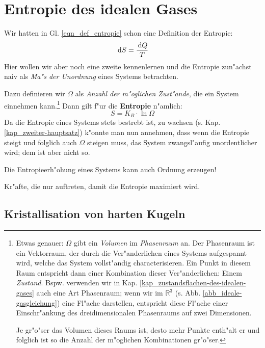 \section{Entropie des idealen Gases}
\label{kap_entropie-des-idealen-gases}


Wir hatten in Gl. \eqref{eqn_def_entropie} schon eine Definition der
Entropie:
$$
\, \mathrm{d} S = \frac{\, \mathrm{d} Q}{T}
$$
Hier wollen wir aber noch eine zweite kennenlernen und die Entropie
zun"achst naiv als \emph{Ma"s der Unordnung} eines Systems betrachten.

Dazu definieren wir $\Omega$ als \emph{Anzahl der m"oglichen
  Zust"ande}, die ein System einnehmen kann.\footnote{Etwas genauer:
  $\Omega$ gibt ein \emph{Volumen} im
  \emph{Phasenraum} an. Der Phasenraum ist ein
  Vektorraum, der durch die Ver"anderlichen eines Systems aufgespannt
  wird, welche das System vollst"andig characterisieren. Ein Punkt in
  diesem Raum entspricht dann einer Kombination dieser
  Ver"anderlichen: Einem \emph{Zustand}. Bspw. verwenden wir in
  Kap. \ref{kap_zustandsflachen-des-idealen-gases} auch eine Art
  Phasenraum; wenn wir im $\mathbb R^3$
  (s. Abb. \ref{abb_ideale-gasgleichung}) eine Fl"ache darstellen,
  entspricht diese Fl"ache einer Einschr"ankung des dreidimensionalen
  Phasenraums auf zwei Dimensionen.

  Je gr"o"ser das Volumen dieses Raums ist, desto mehr Punkte enth"alt er
  und folglich ist so die Anzahl der m"oglichen Kombinationen gr"o"ser.}
Dann gilt f"ur die \textbf{Entropie} n"amlich:
\begin{equation}
   \label{eqn_def_entropie_zustaende}
   S = K_B \cdot \ln \Omega
\end{equation}
Da die Entropie eines Systems stets bestrebt ist, zu wachsen
(s. Kap. \ref{kap_zweiter-hauptsatz}) k"onnte man nun annehmen, dass
wenn die Entropie steigt und folglich auch $\Omega$ steigen muss, das
System zwangsl"aufig unordentlicher wird; dem ist aber nicht so.

\begin{Wichtig}
   Die Entropieerh"ohung eines Systems kann auch Ordnung erzeugen!
\end{Wichtig}

\begin{Def}
    Kr"afte, die nur
   auftreten, damit die Entropie maximiert wird.
\end{Def}


\subsection{Kristallisation von harten Kugeln}
\label{kap_kristallisation-von-harten-kugeln}

